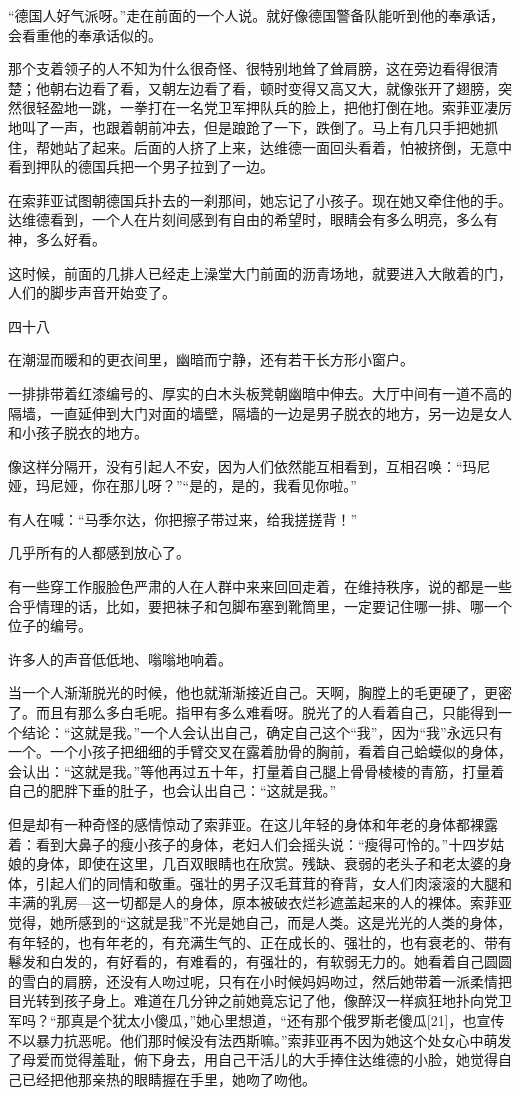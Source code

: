“德国人好气派呀。”走在前面的一个人说。就好像德国警备队能听到他的奉承话，会看重他的奉承话似的。

那个支着领子的人不知为什么很奇怪、很特别地耸了耸肩膀，这在旁边看得很清楚；他朝右边看了看，又朝左边看了看，顿时变得又高又大，就像张开了翅膀，突然很轻盈地一跳，一拳打在一名党卫军押队兵的脸上，把他打倒在地。索菲亚凄厉地叫了一声，也跟着朝前冲去，但是踉跄了一下，跌倒了。马上有几只手把她抓住，帮她站了起来。后面的人挤了上来，达维德一面回头看着，怕被挤倒，无意中看到押队的德国兵把一个男子拉到了一边。

在索菲亚试图朝德国兵扑去的一刹那间，她忘记了小孩子。现在她又牵住他的手。达维德看到，一个人在片刻间感到有自由的希望时，眼睛会有多么明亮，多么有神，多么好看。

这时候，前面的几排人已经走上澡堂大门前面的沥青场地，就要进入大敞着的门，人们的脚步声音开始变了。

四十八

在潮湿而暖和的更衣间里，幽暗而宁静，还有若干长方形小窗户。

一排排带着红漆编号的、厚实的白木头板凳朝幽暗中伸去。大厅中间有一道不高的隔墙，一直延伸到大门对面的墙壁，隔墙的一边是男子脱衣的地方，另一边是女人和小孩子脱衣的地方。

像这样分隔开，没有引起人不安，因为人们依然能互相看到，互相召唤：“玛尼娅，玛尼娅，你在那儿呀？”“是的，是的，我看见你啦。”

有人在喊：“马季尔达，你把擦子带过来，给我搓搓背！”

几乎所有的人都感到放心了。

有一些穿工作服脸色严肃的人在人群中来来回回走着，在维持秩序，说的都是一些合乎情理的话，比如，要把袜子和包脚布塞到靴筒里，一定要记住哪一排、哪一个位子的编号。

许多人的声音低低地、嗡嗡地响着。

当一个人渐渐脱光的时候，他也就渐渐接近自己。天啊，胸膛上的毛更硬了，更密了。而且有那么多白毛呢。指甲有多么难看呀。脱光了的人看着自己，只能得到一个结论：“这就是我。”一个人会认出自己，确定自己这个“我”，因为“我”永远只有一个。一个小孩子把细细的手臂交叉在露着肋骨的胸前，看着自己蛤蟆似的身体，会认出：“这就是我。”等他再过五十年，打量着自己腿上骨骨棱棱的青筋，打量着自己的肥胖下垂的肚子，也会认出自己：“这就是我。”

但是却有一种奇怪的感情惊动了索菲亚。在这儿年轻的身体和年老的身体都裸露着：看到大鼻子的瘦小孩子的身体，老妇人们会摇头说：“瘦得可怜的。”十四岁姑娘的身体，即使在这里，几百双眼睛也在欣赏。残缺、衰弱的老头子和老太婆的身体，引起人们的同情和敬重。强壮的男子汉毛茸茸的脊背，女人们肉滚滚的大腿和丰满的乳房—这一切都是人的身体，原本被破衣烂衫遮盖起来的人的裸体。索菲亚觉得，她所感到的“这就是我”不光是她自己，而是人类。这是光光的人类的身体，有年轻的，也有年老的，有充满生气的、正在成长的、强壮的，也有衰老的、带有鬈发和白发的，有好看的，有难看的，有强壮的，有软弱无力的。她看着自己圆圆的雪白的肩膀，还没有人吻过呢，只有在小时候妈妈吻过，然后她带着一派柔情把目光转到孩子身上。难道在几分钟之前她竟忘记了他，像醉汉一样疯狂地扑向党卫军吗？“那真是个犹太小傻瓜，”她心里想道，“还有那个俄罗斯老傻瓜[21]，也宣传不以暴力抗恶呢。他们那时候没有法西斯嘛。”索菲亚再不因为她这个处女心中萌发了母爱而觉得羞耻，俯下身去，用自己干活儿的大手捧住达维德的小脸，她觉得自己已经把他那亲热的眼睛握在手里，她吻了吻他。

